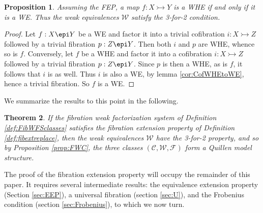 \documentclass[12pt]{article}
\newcommand{\CC}{\ensuremath{\mathcal{C}}}
\newcommand{\WW}{\ensuremath{\mathcal{W}}}
\newcommand{\FF}{\ensuremath{\mathcal{F}}}
\newcommand{\mono}{\ensuremath{\rightarrowtail}}
\newtheorem{theorem}{Theorem}
\newtheorem{proposition}[theorem]{Proposition}
\theoremstyle{remark}
\theoremstyle{definition}
\begin{document}
\begin{proposition}\label{prop:WHEiffWE}
Assuming the FEP, a map $ f : X \mono Y$ is a WHE if and only if it is a WE.  Thus the weak equivalences $\mathcal{W}$ satisfy the 3-for-2 condition.
\end{proposition}
\begin{proof}
Let $ f : X \epi Y$ be a WE and factor it into a trivial cofibration $i : X\mono Z$ followed by a trivial fibration $p: Z\epi Y$.  Then both 
$i$ and $p$ are WHE, whence so is $f$.  Conversely, let $f$ be a WHE and factor it into a cofibration $i : X\mono Z$ followed by a trivial fibration $p: Z\epi Y$. Since  $p$ is then a WHE, as is $f$, it follows that $i$ is as well.  Thus $i$ is also a WE, by lemma \ref{cor:CofWHEtoWE}, hence a trivial fibration. So $f$ is a WE.
\end{proof}

We summarize the results to this point in the following.

\begin{theorem}\label{theorem:QMSmodFEP}
If the fibration weak factorization system of Definition \ref{def:FibWFSclasses} satisfies the fibration extension property of Definition \ref{def:fibextreplace}, then the weak equivalences $\WW$ have the 3-for-2 property, and so by Proposition \ref{prop:FWC}, the three classes $(\CC,\WW,\FF)$ form a Quillen model structure.
\end{theorem}

%

The proof of the fibration extension property will occupy the remainder of this paper.  It requires several intermediate results: the equivalence extension property (Section \ref{sec:EEP}), a universal fibration (section \ref{sec:U}), and the Frobenius condition (section \ref{sec:Frobenius}), to which we now turn.
\end{document}
